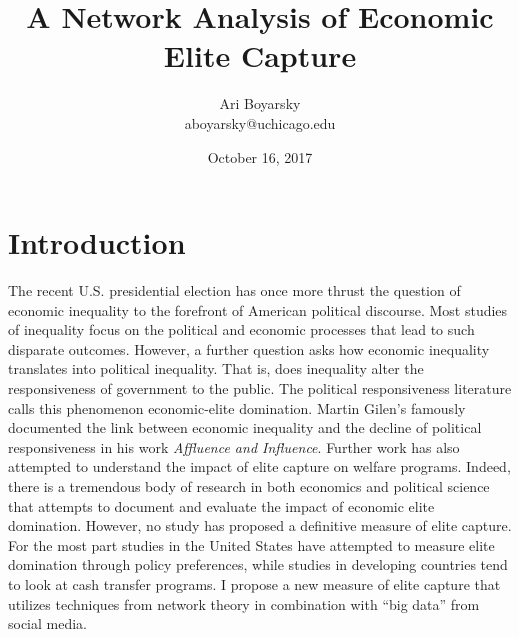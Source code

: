\documentclass[dvips,12pt]{article}
\begin{document}

\title{A Network Analysis of Economic Elite Capture}
\author{Ari Boyarsky \\ aboyarsky@uchicago.edu}
\date{October 16, 2017}



\maketitle


\section{Introduction}

\indent The recent U.S. presidential election has once more thrust the question of economic inequality to the forefront of American political discourse. Most studies of inequality focus on the political and economic processes that lead to such disparate outcomes. However, a further question asks how economic inequality translates into political inequality. That is, does inequality alter the responsiveness of government to the public. The political responsiveness literature calls this phenomenon economic-elite domination.\cite{RefWorks:doc:59e2928ee4b07e3b24389b4d} Martin Gilen’s famously documented the link between economic inequality and the decline of political responsiveness in his work \textit{Affluence and Influence}.\cite{RefWorks:doc:59e2931fe4b0b4635e033b19} Further work has also attempted to understand the impact of elite capture on welfare programs.\cite{RefWorks:doc:59e29357e4b0b4635e033b1f} Indeed, there is a tremendous body of research in both economics and political science that attempts to document and evaluate the impact of economic elite domination. However, no study has proposed a definitive measure of elite capture. For the most part studies in the United States have attempted to measure elite domination through policy preferences, while studies in developing countries tend to look at cash transfer programs. I propose a new measure of elite capture that utilizes techniques from network theory in combination with “big data” from social media. 
\end{document}
